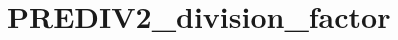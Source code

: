 \hypertarget{group___p_r_e_d_i_v2__division__factor}{\section{P\-R\-E\-D\-I\-V2\-\_\-division\-\_\-factor}
\label{group___p_r_e_d_i_v2__division__factor}
}
